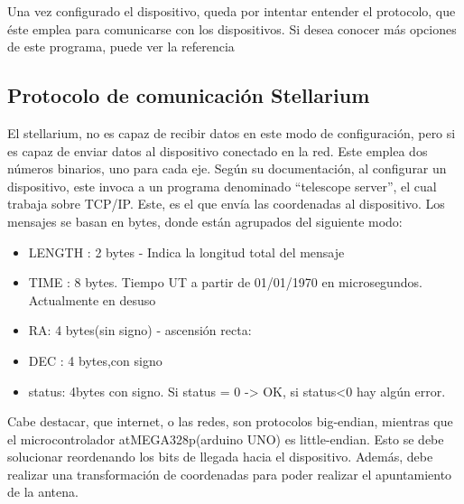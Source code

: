 Una vez configurado el dispositivo, queda por intentar entender el protocolo, que éste emplea para comunicarse con los dispositivos. Si desea conocer más opciones de este programa, puede ver la referencia \cite{stellman}

\subsection{Protocolo de comunicación Stellarium} \label{sub:comun_stell}
El stellarium, no es capaz de recibir datos en este modo de configuración, pero si es capaz de enviar datos al dispositivo conectado en la red. Este emplea dos números binarios, uno para cada eje. Según su documentación, al configurar un dispositivo, este invoca a un programa denominado ``telescope server'', el cual trabaja sobre TCP/IP. Este, es el que envía las coordenadas al dispositivo. Los mensajes se basan en bytes, donde están agrupados del siguiente modo: 

\begin{itemize}
	\item LENGTH : 2 bytes - Indica la longitud total del mensaje
	\item TIME : 8 bytes. Tiempo UT a partir de 01/01/1970 en microsegundos. Actualmente en desuso 
	\item RA: 4 bytes(sin signo) - ascensión recta: 
	\item DEC : 4 bytes,con signo
	\item status: 4bytes con signo. Si status = 0 -> OK, si status<0 hay algún error.  
\end{itemize}

Cabe destacar, que internet, o las redes, son protocolos big-endian, mientras que el microcontrolador atMEGA328p(arduino UNO) es little-endian. Esto se debe solucionar reordenando los bits de llegada hacia el dispositivo. Además, debe realizar una transformación de coordenadas para poder realizar el apuntamiento de la antena. 

